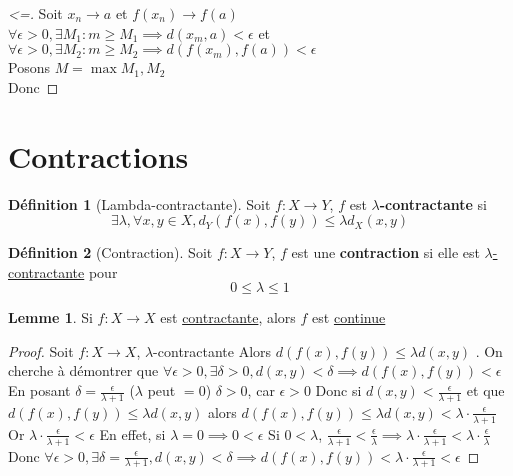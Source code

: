 \documentclass[12pt]{book}
\def\sep{\phantom{}}
\theoremstyle{definition}
\newtheorem{definition}{Définition}[section]
\newtheorem{lemma}[theorem]{Lemme}
\begin{document}
\begin{comment}
    Nos hypothèses de départ. \sep
    En utilisant la définition d'une \hyperref[def:convergence_metrique]{suite convergente}. \sep
    En utilisant la définition de la \hyperref[def:continuite]{continuité} au point $a$ \sep
    Puisque $x_n$ converge vers $a$, on peut substituer $\epsilon_1$ pour $\delta$ \sep.
    On conclut
\end{comment}

\begin{proof}[<=]
    Soit $x_n \to a$ et $f(x_n) \to f(a)$ \sep \\
    $\forall \epsilon > 0, \exists M_1 : m \geq M_1 \implies d(x_m, a) < \epsilon$ et $\forall \epsilon > 0, \exists M_2 : m \geq M_2 \implies d(f(x_m), f(a)) < \epsilon$ \sep \\
    Posons $M =\max{M_1, M_2}$ \sep \\
    Donc
\end{proof}

\section{Contractions}
\begin{definition}[Lambda-contractante]
    \label{def:lambda_contractante}
    Soit $f: X \to Y$, $f$ est \textbf{$\lambda$-contractante} si 
    $$ \exists \lambda, \forall x,y \in X, d_Y(f(x), f(y)) \leq \lambda d_X(x,y) $$
\end{definition}

\begin{definition}[Contraction]
    \label{def:contraction}
    Soit $f: X \to Y$, $f$ est une \textbf{contraction} si elle est \hyperref[def:lambda_contractante]{$\lambda$-contractante}
    pour $$ 0 \leq \lambda \leq 1$$
\end{definition}

\begin{lemma}
    \label{lem:contractante_continue}
    Si $f: X \to X$ est \hyperref[def:contraction]{contractante}, alors $f$ est \hyperref[def:continuite]{continue}
\end{lemma}
\begin{proof}
    Soit $f: X \to X$, $\lambda$-contractante \sep 
    Alors $d(f(x), f(y)) \leq \lambda d(x, y)$ \sep. On cherche à démontrer que 
    $\forall \epsilon > 0, \exists \delta > 0, d(x, y) < \delta \implies d(f(x), f(y)) < \epsilon$ \sep 
    En posant $\delta = \frac{\epsilon}{\lambda + 1}$ ($\lambda$ peut $= 0$) \sep 
    $\delta > 0$, car $\epsilon > 0$ Donc si $d(x, y) < \frac{\epsilon}{\lambda + 1}$ et que $d(f(x), f(y)) \leq \lambda d(x,y)$ \sep 
    alors $d(f(x), f(y)) \leq \lambda d(x,y) < \lambda \cdot \frac{\epsilon}{\lambda + 1}$ \sep 
    Or $\lambda \cdot \frac{\epsilon}{\lambda + 1} <\epsilon$ \sep 
    En effet, si $\lambda = 0 \implies 0 < \epsilon$ \sep 
    Si $0 < \lambda$, $\frac{\epsilon}{\lambda + 1} < \frac{\epsilon}{\lambda} \implies \lambda \cdot \frac{\epsilon}{\lambda + 1} < \lambda \cdot \frac{\epsilon}{\lambda}$ \sep
    Donc $\forall \epsilon > 0, \exists \delta = \frac{\epsilon}{\lambda + 1}, d(x, y) < \delta \implies d(f(x), f(y)) < \lambda \cdot \frac{\epsilon}{\lambda + 1} < \epsilon$  \sep     
\end{proof}
\end{document}

